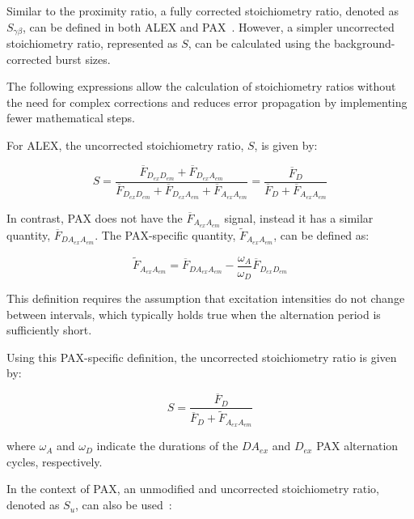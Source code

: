Similar to the proximity ratio, a fully corrected stoichiometry ratio, denoted as $S_{\gamma\beta}$, can be defined in both \ac{ALEX} and \ac{PAX}~\cite{lee_BPJ_2005,ingargiola_JCP_2018}. 
However, a simpler uncorrected stoichiometry ratio, represented as $S$, can be calculated using the background-corrected burst sizes.

The following expressions allow the calculation of stoichiometry ratios without the need for complex corrections and reduces error propagation by implementing fewer mathematical steps. 

For \ac{ALEX}, the uncorrected stoichiometry ratio, $S$, is given by:

\begin{equation}
\label{eqn:Salex}
S=\frac{\overline{F}_{D_{ex}D_{em}} + \overline{F}_{D_{ex}A_{em}}}{\overline{F}_{D_{ex}D_{em}} + \overline{F}_{D_{ex}A_{em}}+\overline{F}_{A_{ex}A_{em}}}=\frac{\overline{F}_D}{\overline{F}_D + \overline{F}_{A_{ex}A_{em}}}
\end{equation}

In contrast, \ac{PAX} does not have the $\overline{F}_{A_{ex}A_{em}}$ signal, instead it has a similar quantity, $\overline{F}_{DA_{ex}A_{em}}$.
The \ac{PAX}-specific quantity, $\tilde{F}_{A_{ex}A_{em}}$, can be defined as\cite{ingargiola_JCP_2018}:

\begin{equation}
    \label{eqn:Faa_pax}
    \tilde{F}_{A_{ex}A_{em}} = \overline{F}_{DA_{ex}A_{em}} - \frac{\omega_A}{\omega_D}\overline{F}_{D_{ex}D_{em}}
\end{equation}

\noindent
This definition requires the assumption that excitation intensities do not change between intervals, which typically holds true when the alternation period is sufficiently short.

Using this \ac{PAX}-specific definition, the uncorrected stoichiometry ratio is given by:

\begin{equation}
\label{eqn:Spax}
S = \frac{\overline{F}_D}{\overline{F}_D + \tilde{F}_{A_{ex}A_{em}}}
\end{equation}

\noindent
where $\omega_A$ and $\omega_D$ indicate the durations of the $DA_{ex}$ and $D_{ex}$ \ac{PAX} alternation cycles, respectively.

In the context of \ac{PAX}, an unmodified and uncorrected stoichiometry ratio, denoted as $S_u$, can also be used~\cite{ingargiola_JCP_2018}:

